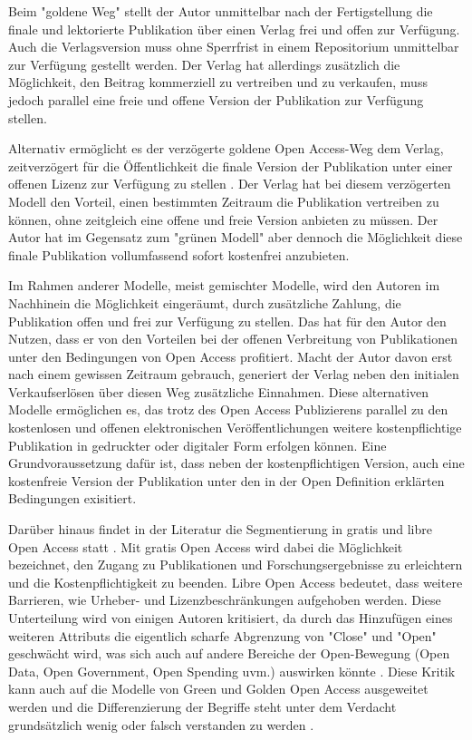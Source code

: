 Beim "goldene Weg" stellt der Autor unmittelbar nach der Fertigstellung die finale und lektorierte Publikation über einen Verlag frei und offen zur Verfügung. Auch die Verlagsversion muss ohne Sperrfrist in einem Repositorium unmittelbar zur Verfügung gestellt werden. Der Verlag hat allerdings zusätzlich die Möglichkeit, den Beitrag kommerziell zu vertreiben und zu verkaufen, muss jedoch parallel eine freie und offene Version der Publikation zur Verfügung stellen.

Alternativ ermöglicht es der verzögerte goldene Open Access-Weg dem Verlag, zeitverzögert für die Öffentlichkeit die finale Version der Publikation unter einer offenen Lizenz zur Verfügung zu stellen \cite{lewis_2012_inevitability}. Der Verlag hat bei diesem verzögerten Modell den Vorteil, einen bestimmten Zeitraum die Publikation vertreiben zu können, ohne zeitgleich eine offene und freie Version anbieten zu müssen. Der Autor hat im Gegensatz zum "grünen Modell" aber dennoch die Möglichkeit diese finale Publikation vollumfassend sofort kostenfrei anzubieten.

Im Rahmen anderer Modelle, meist gemischter Modelle, wird den Autoren im Nachhinein die Möglichkeit eingeräumt, durch zusätzliche Zahlung, die Publikation offen und frei zur Verfügung zu stellen\cite{lewis_2012_inevitability}. Das hat für den Autor den Nutzen, dass er von den Vorteilen bei der offenen Verbreitung von Publikationen unter den Bedingungen von Open Access profitiert. Macht der Autor davon erst nach einem gewissen Zeitraum gebrauch, generiert der Verlag neben den initialen Verkaufserlösen über diesen Weg zusätzliche Einnahmen. Diese alternativen Modelle ermöglichen es, das trotz des Open Access Publizierens parallel zu den kostenlosen und offenen elektronischen Veröffentlichungen weitere kostenpflichtige Publikation in gedruckter oder digitaler Form erfolgen können. Eine Grundvoraussetzung dafür ist, dass neben der kostenpflichtigen Version, auch eine kostenfreie Version der Publikation unter den in der Open Definition erklärten Bedingungen exisitiert.

Darüber hinaus findet in der Literatur die Segmentierung in gratis und libre Open Access statt \cite{Martin_2013} \cite{naeder_2010_open} \cite{Mounce_2015}. Mit gratis Open Access wird dabei die Möglichkeit bezeichnet, den Zugang zu Publikationen und Forschungsergebnisse zu erleichtern und die Kostenpflichtigkeit zu beenden. Libre Open Access bedeutet, dass weitere Barrieren, wie Urheber- und Lizenzbeschränkungen aufgehoben werden. \cite{Adema_2014_open_access} Diese Unterteilung wird von einigen Autoren kritisiert, da durch das Hinzufügen eines weiteren Attributs die eigentlich scharfe Abgrenzung von "Close" und "Open" geschwächt wird, was sich auch auf andere Bereiche der Open-Bewegung (Open Data, Open Government, Open Spending uvm.) auswirken könnte \cite{suchen}. Diese Kritik kann auch auf die Modelle von Green und Golden Open Access ausgeweitet werden und die Differenzierung der Begriffe steht unter dem Verdacht grundsätzlich wenig oder falsch verstanden zu werden \cite{Mounce_2015}.

